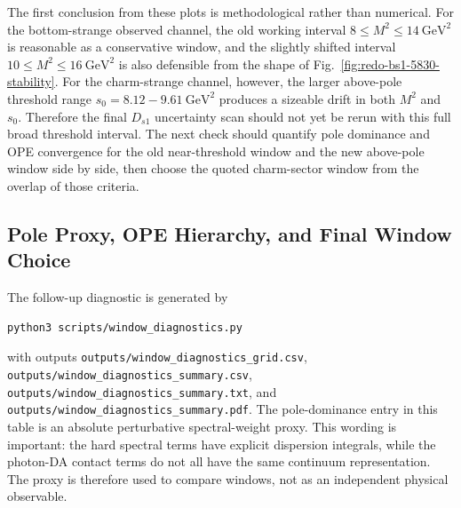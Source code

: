 \documentclass[11pt]{article}
\newcommand{\GeV}{\mathrm{GeV}}
\begin{document}
The first conclusion from these plots is methodological rather than numerical.
For the bottom-strange observed channel, the old working interval
\(8\le M^2\le14~\GeV^2\) is reasonable as a conservative window, and the
slightly shifted interval \(10\le M^2\le16~\GeV^2\) is also defensible from the
shape of Fig.~\ref{fig:redo-bs1-5830-stability}.  For the charm-strange
channel, however, the larger above-pole threshold range
\(s_0=8.12-9.61~\GeV^2\) produces a sizeable drift in both \(M^2\) and \(s_0\).
Therefore the final \(D_{s1}\) uncertainty scan should not yet be rerun with
this full broad threshold interval.  The next check should quantify pole
dominance and OPE convergence for the old near-threshold window and the new
above-pole window side by side, then choose the quoted charm-sector window from
the overlap of those criteria.

\subsection{Pole Proxy, OPE Hierarchy, and Final Window Choice}

The follow-up diagnostic is generated by
\begin{verbatim}
python3 scripts/window_diagnostics.py
\end{verbatim}
with outputs
\texttt{outputs/window\_diagnostics\_grid.csv},
\texttt{outputs/window\_diagnostics\_summary.csv},
\texttt{outputs/window\_diagnostics\_summary.txt}, and
\texttt{outputs/window\_diagnostics\_summary.pdf}.  The pole-dominance entry in
this table is an absolute perturbative spectral-weight proxy.  This wording is
important: the hard spectral terms have explicit dispersion integrals, while
the photon-DA contact terms do not all have the same continuum representation.
The proxy is therefore used to compare windows, not as an independent physical
observable.
\end{document}
